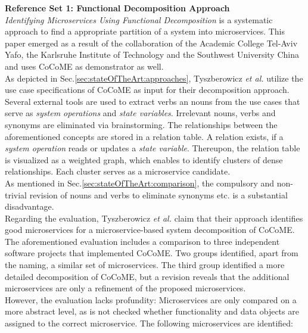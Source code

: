 \noindent
\textbf{Reference Set 1: Functional Decomposition Approach} \\
\textit{Identifying Microservices Using Functional Decomposition} \cite{FunctionalDecompositionHeinrich} is a systematic approach to find a appropriate partition of a system into microservices. This paper emerged as a result of the collaboration of the Academic College Tel-Aviv Yafo, the Karlsruhe Institute of Technology and the Southwest University China and uses CoCoME as demonstrator as well.\\
As depicted in Sec.\ref{sec:stateOfTheArt:approaches}, Tyszberowicz \textit{et al.} utilize the use case specifications of CoCoME \cite{CoCoMEOld} as input for their decomposition approach. Several external tools are used to extract verbs an nouns from the use cases that serve as \textit{system operations} and \textit{state variables}. Irrelevant nouns, verbs and synonyms are eliminated via brainstorming. The relationships between the aforementioned concepts are stored in a relation table. A relation exists, if a \textit{system operation} reads or updates a \textit{state variable}. Thereupon, the relation table is visualized as a weighted graph, which enables to identify clusters of dense relationships. Each cluster serves as a microservice candidate.\\
As mentioned in Sec.\ref{sec:stateOfTheArt:comparison}, the compulsory and non-trivial revision of nouns and verbs to eliminate synonyms etc. is a substantial disadvantage.\\
Regarding the evaluation, Tyszberowicz \textit{et al.} claim that their approach identifies good microservices for a microservice-based system decomposition of CoCoME. The aforementioned evaluation includes a comparison to three independent software projects that implemented CoCoME. Two groups identified, apart from the naming, a similar set of microservices. The third group identified a more detailed decomposition of CoCoME, but a revision reveals that the additional microservices are only a refinement of the proposed microservices. \\
However, the evaluation lacks profundity: Microservices are only compared on a more abstract level, as is not checked whether functionality and data objects are assigned to the correct microservice. The following microservices are identified: 



